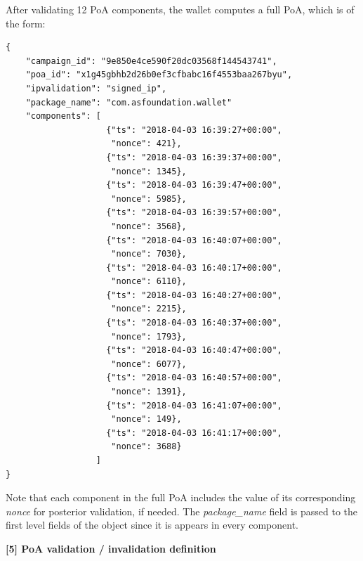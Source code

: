 After validating 12 \textsf{PoA} components, the wallet computes a full \textsf{PoA}, which is of the form:
\begin{tcolorbox}[enhanced jigsaw,sharp corners, drop fuzzy shadow=ShadowColor]
\begin{lstlisting}[xleftmargin=0.05\textwidth]
{
    "campaign_id": "9e850e4ce590f20dc03568f144543741",
    "poa_id": "x1g45gbhb2d26b0ef3cfbabc16f4553baa267byu",
    "ipvalidation": "signed_ip",
    "package_name": "com.asfoundation.wallet"
    "components": [
                    {"ts": "2018-04-03 16:39:27+00:00",
                     "nonce": 421},
                    {"ts": "2018-04-03 16:39:37+00:00",
                     "nonce": 1345},
                    {"ts": "2018-04-03 16:39:47+00:00",
                     "nonce": 5985},
                    {"ts": "2018-04-03 16:39:57+00:00",
                     "nonce": 3568},
                    {"ts": "2018-04-03 16:40:07+00:00",
                     "nonce": 7030},
                    {"ts": "2018-04-03 16:40:17+00:00",
                     "nonce": 6110},
                    {"ts": "2018-04-03 16:40:27+00:00",
                     "nonce": 2215},
                    {"ts": "2018-04-03 16:40:37+00:00",
                     "nonce": 1793},
                    {"ts": "2018-04-03 16:40:47+00:00",
                     "nonce": 6077},
                    {"ts": "2018-04-03 16:40:57+00:00",
                     "nonce": 1391},
                    {"ts": "2018-04-03 16:41:07+00:00",
                     "nonce": 149},
                    {"ts": "2018-04-03 16:41:17+00:00",
                     "nonce": 3688}
                  ]
}
\end{lstlisting}
\end{tcolorbox}
Note that each component in the full \textsf{PoA} includes the value of its corresponding \textit{nonce} for posterior validation, if needed. The \textit{package\_name} field is passed to the first level fields of the object since it is appears in every component. \\


\medskip

{\bf [5] PoA validation / invalidation definition}





